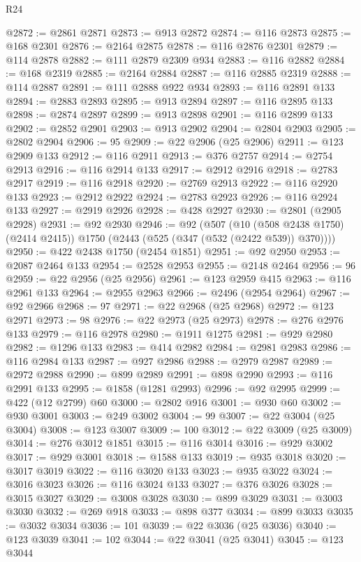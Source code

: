 \begin{lexlean}{R24}
\begin{coremodule}
@2872 := @2861 @2871
@2873 := @913 @2872
@2874 := @116 @2873
@2875 := @168 @2301
@2876 := @2164 @2875
@2878 := @116 @2876 @2301
@2879 := @114 @2878
@2882 := @111 @2879 @2309 @934
@2883 := @116 @2882
@2884 := @168 @2319
@2885 := @2164 @2884
@2887 := @116 @2885 @2319
@2888 := @114 @2887
@2891 := @111 @2888 @922 @934
@2893 := @116 @2891 @133
@2894 := @2883 @2893
@2895 := @913 @2894
@2897 := @116 @2895 @133
@2898 := @2874 @2897
@2899 := @913 @2898
@2901 := @116 @2899 @133
@2902 := @2852 @2901
@2903 := @913 @2902
@2904 := @2804 @2903
@2905 := @2802 @2904
@2906 := 95
@2909 := @22 @2906 (@25 @2906)
@2911 := @123 @2909 @133
@2912 := @116 @2911
@2913 := @376 @2757
@2914 := @2754 @2913
@2916 := @116 @2914 @133
@2917 := @2912 @2916
@2918 := @2783 @2917
@2919 := @116 @2918
@2920 := @2769 @2913
@2922 := @116 @2920 @133
@2923 := @2912 @2922
@2924 := @2783 @2923
@2926 := @116 @2924 @133
@2927 := @2919 @2926
@2928 := @428 @2927
@2930 := @2801 (@2905 @2928)
@2931 := @92 @2930
@2946 := @92
    (@507
      (@10 (@508 @2438 @1750) (@2414 @2415))
      @1750
      (@2443 (@525 (@347 (@532 (@2422 @539)) @370))))
@2950 := @422 @2438 @1750 (@2454 @1851)
@2951 := @92 @2950
@2953 := @2087 @2464 @133
@2954 := @2528 @2953
@2955 := @2148 @2464
@2956 := 96
@2959 := @22 @2956 (@25 @2956)
@2961 := @123 @2959 @415
@2963 := @116 @2961 @133
@2964 := @2955 @2963
@2966 := @2496 (@2954 @2964)
@2967 := @92 @2966
@2968 := 97
@2971 := @22 @2968 (@25 @2968)
@2972 := @123 @2971
@2973 := 98
@2976 := @22 @2973 (@25 @2973)
@2978 := @276 @2976 @133
@2979 := @116 @2978
@2980 := @1911 @1275
@2981 := @929 @2980
@2982 := @1296 @133
@2983 := @414 @2982
@2984 := @2981 @2983
@2986 := @116 @2984 @133
@2987 := @927 @2986
@2988 := @2979 @2987
@2989 := @2972 @2988
@2990 := @899 @2989
@2991 := @898 @2990
@2993 := @116 @2991 @133
@2995 := @1858 (@1281 @2993)
@2996 := @92 @2995
@2999 := @422 (@12 @2799) @60
@3000 := @2802 @916
@3001 := @930 @60
@3002 := @930 @3001
@3003 := @249 @3002
@3004 := 99
@3007 := @22 @3004 (@25 @3004)
@3008 := @123 @3007
@3009 := 100
@3012 := @22 @3009 (@25 @3009)
@3014 := @276 @3012 @1851
@3015 := @116 @3014
@3016 := @929 @3002
@3017 := @929 @3001
@3018 := @1588 @133
@3019 := @935 @3018
@3020 := @3017 @3019
@3022 := @116 @3020 @133
@3023 := @935 @3022
@3024 := @3016 @3023
@3026 := @116 @3024 @133
@3027 := @376 @3026
@3028 := @3015 @3027
@3029 := @3008 @3028
@3030 := @899 @3029
@3031 := @3003 @3030
@3032 := @269 @918
@3033 := @898 @377
@3034 := @899 @3033
@3035 := @3032 @3034
@3036 := 101
@3039 := @22 @3036 (@25 @3036)
@3040 := @123 @3039
@3041 := 102
@3044 := @22 @3041 (@25 @3041)
@3045 := @123 @3044

\end{coremodule}
\end{lexlean}
